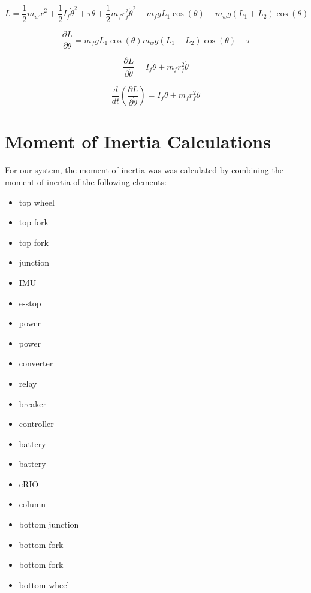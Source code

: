 \documentclass{article}
\begin{document}
\begin{equation}
L = \frac{1}{2} m_{w} \dot{x}^2 + \frac{1}{2} I_{f} \dot{\theta}^2 + \tau \theta + \frac{1}{2} m_{f} r_{f}^2 \dot{\theta}^2 - m_{f} g L_{1} \cos(\theta) - m_{w} g (L_{1} + L_{2}) \cos(\theta)
\end{equation}

\begin{equation}
\frac{\partial{L}}{\partial{{\theta}}} =  m_{f} g L_{1} \cos(\theta)  m_{w} g (L_{1} + L_{2}) \cos(\theta) + \tau
\end{equation}

\begin{equation}
\frac{\partial{L}}{\partial{\dot{\theta}}} = I_{f} \dot{\theta} + m_{f} r_{f}^2 \dot{\theta}
\end{equation}

\begin{equation}
\frac{d}{dt} \left(\frac{\partial{L}}{\partial{\dot{\theta}}}\right) = I_{f} \ddot{\theta} + m_{f} r_{f}^2 \ddot{\theta}
\end{equation}


\newpage
\section{Moment of Inertia Calculations}
For our system, the moment of inertia was was calculated by combining the moment of inertia of the following elements:
\begin{itemize}
\item top wheel
\item top fork
\item top fork
\item junction
\item IMU
\item e-stop
\item power
\item power
\item converter
\item relay
\item breaker
\item controller
\item battery
\item battery
\item cRIO
\item column
\item bottom junction
\item bottom fork
\item bottom fork
\item bottom wheel
\end{itemize}
\end{document}
